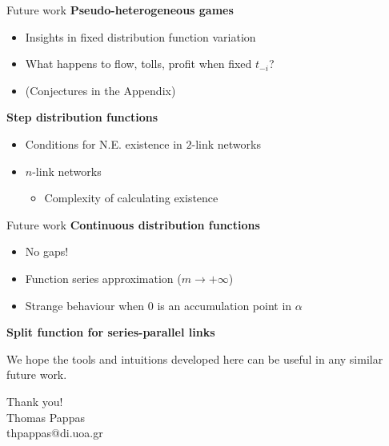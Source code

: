 \documentclass{beamer}
\begin{document}
\begin{frame}{Future work}
	\textbf{Pseudo-heterogeneous games}\pause
	\begin{itemize}
		\item Insights in fixed distribution function variation\pause
		\item What happens to flow, tolls, profit when fixed $t_{-i}$?\pause
		\item (Conjectures in the Appendix)
	\end{itemize}\pause

	\textbf{Step distribution functions}\pause
	\begin{itemize}
		\item Conditions for N.E. existence in $2$-link networks\pause
		\item $n$-link networks\pause
		\begin{itemize}
			\item Complexity of calculating existence
		\end{itemize}
	\end{itemize}
\end{frame}

\begin{frame}{Future work}
	\textbf{Continuous distribution functions}\pause
	\begin{itemize}
		\item No gaps!\pause
		\item Function series approximation ($m \rightarrow +\infty$)\pause
		\item Strange behaviour when $0$ is an accumulation point in $\alpha$
	\end{itemize}\pause

	\textbf{Split function for series-parallel links}\pause

	We hope the tools and intuitions developed here can be useful in any similar future work.
\end{frame}

\begin{frame}{}
	\centering
    \huge Thank you!\\
    \normalsize Thomas Pappas\\
    thpappas@di.uoa.gr
\end{frame}
\end{document}
